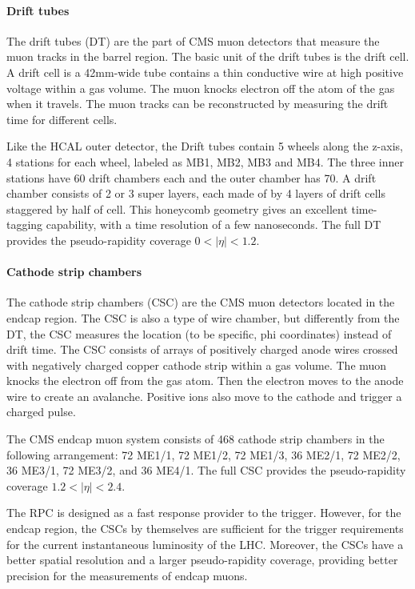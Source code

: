 \paragraph{Drift tubes}
The drift tubes (DT) are the part of CMS muon detectors that measure the muon tracks in the barrel region. The basic unit of the drift tubes is the drift cell. A drift cell is a 42mm-wide tube contains a thin conductive wire at high positive voltage within a gas volume. The muon knocks electron off the atom of the gas when it travels. The muon tracks can be reconstructed by measuring the drift time for different cells. 

Like the HCAL outer detector, the Drift tubes contain 5 wheels along the z-axis, 4 stations for each wheel, labeled as MB1, MB2, MB3 and MB4. The three inner stations have 60 drift chambers each and the outer chamber has 70. A drift chamber consists of 2 or 3 super layers, each made of by 4 layers of drift cells staggered by half of cell. This honeycomb geometry gives an excellent time-tagging capability, with a time resolution of a few nanoseconds. The full DT provides the pseudo-rapidity coverage $0<|\eta|<1.2$.

\paragraph{Cathode strip chambers}
The cathode strip chambers (CSC) are the CMS muon detectors located in the endcap region. The CSC is also a type of wire chamber, but differently from the DT, the CSC measures the location (to be specific, phi coordinates) instead of drift time. The CSC consists of arrays of positively charged anode wires crossed with negatively charged copper cathode strip within a gas volume. The muon knocks the electron off from the gas atom. Then the electron moves to the anode wire to create an avalanche. Positive ions also move to the cathode and trigger a charged pulse.

The CMS endcap muon system consists of 468 cathode strip chambers in the following arrangement: 72 ME1/1, 72 ME1/2, 72 ME1/3, 36 ME2/1, 72 ME2/2, 36 ME3/1, 72 ME3/2, and 36 ME4/1. The full CSC provides the pseudo-rapidity coverage $1.2<|\eta|<2.4$. 

The RPC is designed as a fast response provider to the trigger. However, for the endcap region, the CSCs by themselves are sufficient for the trigger requirements for the current instantaneous luminosity of the LHC. Moreover, the CSCs have a better spatial resolution and a larger pseudo-rapidity coverage, providing better precision for the measurements of endcap muons.

